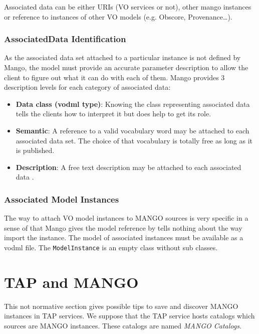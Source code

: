 \documentclass[11pt,a4paper]{ivoa}
\begin{document}
Associated data can be either URIs (VO services or not), other mango instances or reference to instances of other VO models (e.g. Obscore, Provenance…).

\subsubsection{AssociatedData Identification}
As the associated data set  attached to a particular instance is not defined by Mango, the model must provide an accurate parameter description to allow the client to figure out what it can do with each of them.
Mango provides 3 description levels for each category of associated data:

\begin{itemize}
    \item \textbf{Data class (vodml type)}: Knowing the class representing associated data tells the clients  how to interpret it but does help to get its role.
    \item \textbf{Semantic}: A reference to  a valid vocabulary word may be attached to each associated data set. 
             The choice of that vocabulary is totally free as long as it is published.
    \item \textbf{Description}: A free text description may be attached to each associated data .
 \end{itemize}

\subsubsection{Associated Model Instances}
The way to attach VO model instances to MANGO sources is very specific in a sense of that Mango gives the model reference by tells nothing about the way import  the instance.
The model of associated instances must be available as a vodml file.
The \texttt{ModelInstance} is an empty class without sub classes.






\section{TAP and MANGO}
This not normative section gives possible tips to save and discover MANGO instances in TAP services.
We suppose that the TAP service hosts catalogs which sources are MANGO instances. These catalogs are named \emph{MANGO Catalogs}.
\end{document}

